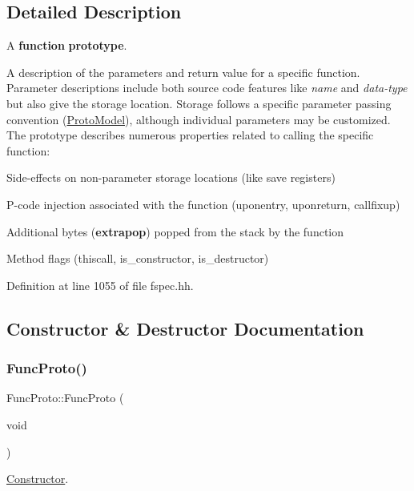 \subsection{Detailed Description}
A {\bfseries{function}} {\bfseries{prototype}}. 

A description of the parameters and return value for a specific function. Parameter descriptions include both source code features like {\itshape name} and {\itshape data-\/type} but also give the storage location. Storage follows a specific parameter passing convention (\mbox{\hyperlink{class_proto_model}{Proto\+Model}}), although individual parameters may be customized. The prototype describes numerous properties related to calling the specific function\+:
\begin{DoxyItemize}
\item Side-\/effects on non-\/parameter storage locations (like save registers)
\item P-\/code injection associated with the function (uponentry, uponreturn, callfixup)
\item Additional bytes ({\bfseries{extrapop}}) popped from the stack by the function
\item Method flags (thiscall, is\+\_\+constructor, is\+\_\+destructor) 
\end{DoxyItemize}

Definition at line 1055 of file fspec.\+hh.



\subsection{Constructor \& Destructor Documentation}
\mbox{\label{class_func_proto_a9c7db7dec63a18a9de97b0ba9f6f42bd}} 
\subsubsection{\texorpdfstring{FuncProto()}{FuncProto()}}
{\footnotesize\ttfamily Func\+Proto\+::\+Func\+Proto (\begin{DoxyParamCaption}\item[{void}]{ }\end{DoxyParamCaption})}



\mbox{\hyperlink{class_constructor}{Constructor}}. 



